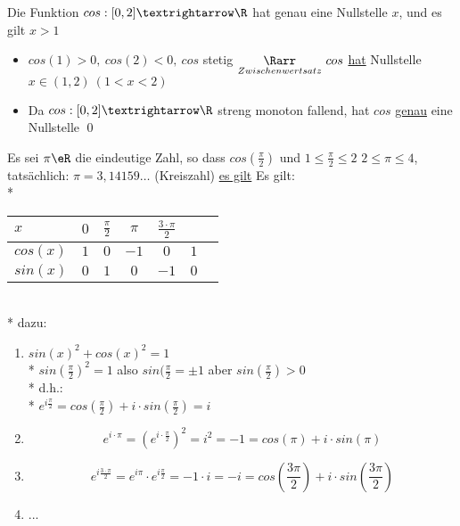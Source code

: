 Die Funktion $cos:[0,2]→\R$ hat genau eine Nullstelle $x$, und es gilt $x>1$
\bew
\begin{itemize}
\item{$cos(1)>0,\ cos(2)<0,\ cos$ stetig $\underset{Zwischenwertsatz}{\Rarr}\ cos$ \ul{hat} Nullstelle $x\in(1,2)\ (1<x<2)$}
\item{Da $cos:[0,2]→\R$ streng monoton fallend, hat $cos$ \ul{genau} eine Nullstelle \qed}
\end{itemize}

Es sei $\pi\eR$ die eindeutige Zahl, so dass $cos(\frac{\pi}{2})$ und $1\leq\frac{\pi}{2}\leq 2$
\bem
$2\leq \pi \leq 4$, tatsächlich: $\pi=3,14159…$ (Kreiszahl)
\ul{es gilt}
Es gilt:\\*
\begin{tabular}{l|c|c|c|c|c|l}
$x$ & $0$ & $\frac{\pi}{2}$ & $\pi$ & $\frac{3 \cdot \pi}{2}$ &\\\hline
$cos(x)$ & $1$ & $0$ & $-1$ & $0$ & $1$ & \\\hline
$sin(x)$ & $0$ & $1$ & $0$ & $-1$ & $0$ & \\\hline
\end{tabular}
\hfill\\*
dazu:
\begin{enumerate}
\item{$sin(x)^2 + cos(x)^2 = 1$\\*
$sin(\frac{\pi}{2})^2 = 1$ also $sin(\frac{\pi}{2} = \pm 1$ aber $sin(\frac{\pi}{2}) > 0$\\*
d.h.:\\*
$e^{i \frac{\pi}{2}} = cos(\frac{\pi}{2}) + i \cdot sin(\frac{\pi}{2}) = i$}
\item{$$e^{i\cdot \pi} = (e^{i\cdot \frac{\pi}{2}})^2 = i^2 = -1 = cos(\pi) + i \cdot sin(\pi)$$}
\item{$$e^{i\frac{3 \cdot \pi}{2}} = e^{i\pi} \cdot e^{i\frac{\pi}{2}} = -1 \cdot i = -i = cos(\frac{3\pi}{2}) + i \cdot sin(\frac{3\pi}{2})$$}
\item{...}
\end{enumerate}

